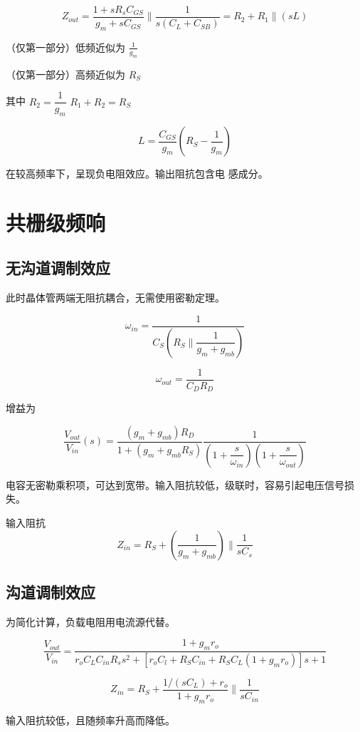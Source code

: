 \documentclass[cn,11pt,chinese,black,simple]{../elegantbook}
\begin{document}
\[Z_{out} = \frac{1 + s R_s C_{GS}}{g_m + s C_{GS}} \| \frac{1}{s (C_L + C_{SB}) } = R_2 + R_1 \| (s L)\]

（仅第一部分）低频近似为 \(\frac{1}{g_m}\) 

（仅第一部分）高频近似为 \(R_S\)

其中  \(R_2 = \dfrac{1}{g_m}\) \(R_1 + R_2 = R_S\)

\[L = \frac{C_{GS}}{g_m} (R_S - \frac{1}{g_m})\]


在较高频率下，呈现负电阻效应。输出阻抗包含电
感成分。

\section{共栅级频响}

\subsection{无沟道调制效应}

此时晶体管两端无阻抗耦合，无需使用密勒定理。

\[\omega_{in} = \dfrac{1}{C_S (R_S \| \dfrac{1}{g_m + g_{mb}})}\]

\[\omega_{out} = \frac{1}{C_D R_D}\]

增益为 

\[\frac{V_{out}}{V_{in}}(s) = \frac{(g_m + g_{mb}) R_D}{1 + (g_m + g_{mb} R_S)} \dfrac{1}{(1 + \dfrac{s}{\omega_{in}}) (1 + \dfrac{s}{\omega_{out}})} \]

电容无密勒乘积项，可达到宽带。输入阻抗较低，级联时，容易引起电压信号损失。

输入阻抗 
\[Z_{in} = R_S + (\frac{1}{g_m +g_{mb}}) \| \frac{1}{s C_s}\]


\subsection{沟道调制效应}

为简化计算，负载电阻用电流源代替。

\[\frac{V_{out}}{V_{in}} = \frac{1 + g_m r_o}{r_o C_L C_{in} R_s s^2 + [r_o C_l + R_S C_{in} + R_S C_L (1 + g_m r_o)]s + 1}\]

\[Z_{in} =  R_S +  \frac{1/(s C_L) + r_o}{1 + g_m r_o} \| \frac{1}{s C_{in}}\]

输入阻抗较低，且随频率升高而降低。

\end{document}
